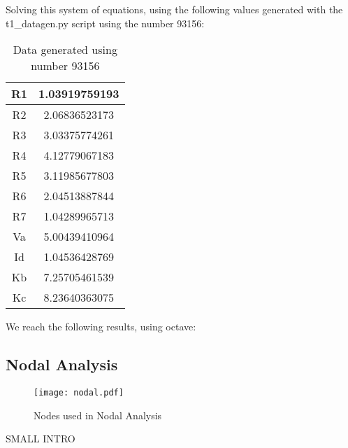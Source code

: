 Solving this system of equations, using the following values generated with the t1\_datagen.py script using the number 93156:


\begin{table}[H]
  \centering
  \begin{tabular}{ c c }
    R1 & 1.03919759193 \\ 
    \hline
    R2 & 2.06836523173 \\ 
    \hline
    R3 & 3.03375774261 \\ 
    \hline
    R4 & 4.12779067183 \\ 
    \hline
    R5 & 3.11985677803 \\ 
    \hline
    R6 & 2.04513887844 \\ 
    \hline
    R7 & 1.04289965713 \\ 
    \hline
    Va & 5.00439410964 \\ 
    \hline
    Id & 1.04536428769 \\ 
    \hline
    Kb & 7.25705461539 \\ 
    \hline
    Kc & 8.23640363075 \\ 
  \end{tabular}
  \caption{Data generated using number 93156}
  \label{tab:data}
\end{table}




We reach the following results, using octave:

    









\subsection{Nodal Analysis}

\begin{figure}[H] \centering
  \texttt{[image: nodal.pdf]}
  \caption{Nodes used in Nodal Analysis}
  \label{fig:mesh}
\end{figure}


SMALL INTRO

